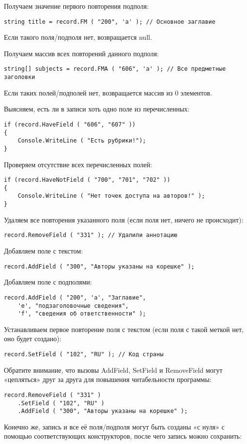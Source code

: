 Получаем значение первого повторения подполя:
\begin{lstlisting}
string title = record.FM ( "200", 'a' ); // Основное заглавие
\end{lstlisting}
Если такого поля/подполя нет, возвращается null.

Получаем массив всех повторений данного подполя:
\begin{lstlisting}
string[] subjects = record.FMA ( "606", 'a' ); // Все предметные заголовки
\end{lstlisting}
Если таких полей/подполей нет, возвращается массив из 0 элементов. 

Выясняем, есть ли в записи хоть одно поле из перечисленных: 
\begin{lstlisting}
if (record.HaveField ( "606", "607" ))
{
	Console.WriteLine ( "Есть рубрики!");
}
\end{lstlisting}
Проверяем отсутствие всех перечисленных полей:
\begin{lstlisting}
if (record.HaveNotField ( "700", "701", "702" ))
{
	Console.WriteLine ( "Нет точек доступа на авторов!" );
}
\end{lstlisting}
Удаляем все повторения указанного поля (если поля нет, ничего не происходит):
\begin{lstlisting}
record.RemoveField ( "331" ); // Удалили аннотацию
\end{lstlisting}
Добавляем поле с текстом:
\begin{lstlisting}
record.AddField ( "300", "Авторы указаны на корешке" );
\end{lstlisting}
Добавляем поле с подполями:
\begin{lstlisting}
record.AddField ( "200", 'a', "Заглавие",
	'e', "подзаголовочные сведения",
	'f', "сведения об ответственности" );
\end{lstlisting}
Устанавливаем первое повторение поля с текстом (если поля с такой меткой нет, оно будет создано):
\begin{lstlisting}
record.SetField ( "102", "RU" ); // Код страны
\end{lstlisting}
Обратите внимание, что вызовы AddField, SetField и RemoveField могут «цепляться» друг за друга для повышения читабельности программы:
\begin{lstlisting}
record.RemoveField ( "331" )
	.SetField ( "102", "RU" )
	.AddField ( "300", "Авторы указаны на корешке" );
\end{lstlisting}
Конечно же, запись и все её поля/подполя могут быть созданы «с нуля» с помощью соответствующих конструкторов, после чего запись можно сохранить:
